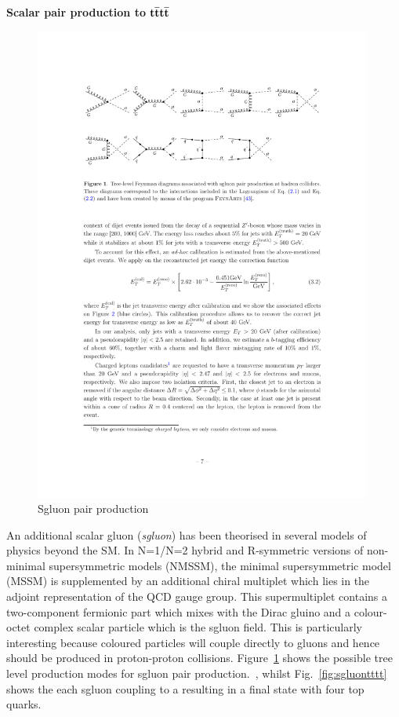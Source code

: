 

\textbf{Scalar pair production to }$\boldsymbol{\mathrm{t}\overline{\mathrm{t}}\mathrm{t}\overline{\mathrm{t}}}$\\

\begin{figure}[ht!]
\centering
    \includegraphics[width=0.99\textwidth]{images/Theory/sgluonFeyn.pdf}
    \caption{Sgluon pair production~\cite{Calvet:2012rk}}
    \label{fig:sgluonpair}
\end{figure}

An additional scalar gluon (\emph{sgluon}) has been theorised in several models of physics beyond the SM. In N=1/N=2 hybrid and R-symmetric versions of non-minimal supersymmetric models (NMSSM), the minimal supersymmetric model (MSSM) is supplemented by an additional chiral multiplet which lies in the adjoint representation of the QCD gauge group. This supermultiplet contains a two-component fermionic part which mixes with the Dirac gluino and a colour-octet complex scalar particle which is the sgluon field. This is particularly interesting because coloured particles will couple directly to gluons and hence should be produced in proton-proton collisions. Figure~\ref{fig:sgluonpair} shows the possible tree level production modes for sgluon pair production.~\cite{Calvet:2012rk}, whilst Fig.~\ref{fig:sgluontttt} shows the each sgluon coupling to a \ttbar resulting in a final state with four top quarks.

